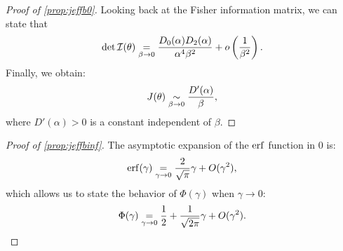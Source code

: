 \begin{proof}[Proof of \cref{prop:jeffb0}]
Looking back at the Fisher information matrix, we can state that
    \begin{equation}
        \det\mathcal{I}(\theta)\overset{}{\underset{\beta\rightarrow0}{=}}\frac{D_0(\alpha)D_2(\alpha)}{\alpha^4\beta^2} + o\left(\frac{1}{\beta^2}\right).
    \end{equation}
Finally, we obtain:
\begin{equation}\label{eq:Jrate}
    J(\theta)\underset{\beta\rightarrow0}{\sim} \frac{D'(\alpha)}{\beta},
\end{equation}
where $D'(\alpha)>0$ is a constant independent of $\beta$.
\end{proof}





\begin{proof}[Proof of \cref{prop:jeffbinf}]

The asymptotic expansion of the $\operatorname{erf}$ function in $0$ is:
    \begin{equation}
        \operatorname{erf}(\gamma)\overset{}{\underset{\gamma\rightarrow0}{=}}\frac{2}{\sqrt{\pi}} \gamma+O(\gamma^2) ,
    \end{equation}
which allows us to state the behavior of $\Phi(\gamma)$ when $\gamma\to0$: 
\begin{equation}
    \Phi(\gamma)\overset{}{\underset{\gamma\rightarrow0}{=}} \frac{1}{2} + \frac{1}{\sqrt{2\pi}} \gamma+O(\gamma^2).    
\end{equation}
 

\end{proof}
